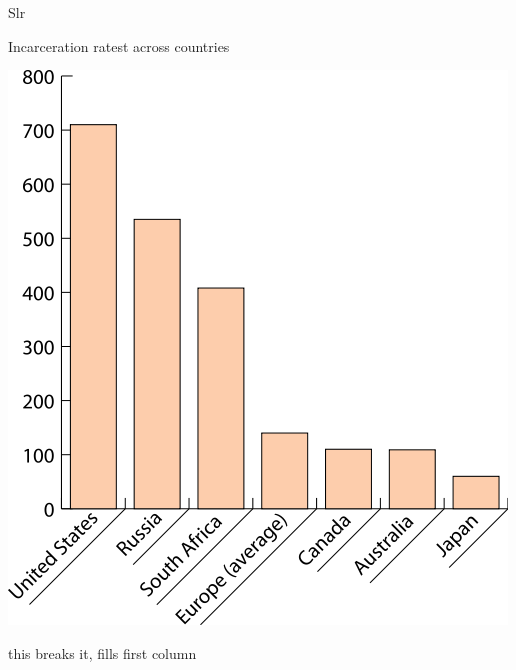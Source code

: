 \begin{chart}{S}{lr}
\caption{Incarceration ratest across countries}
\label{chart:incarceration}
\includegraphics[width=\chartwidth,height=\chartheight]{incarceration}  
\end{chart}

\lipsum[1-4]
\lipsum[1-5] this breaks it, fills first column

